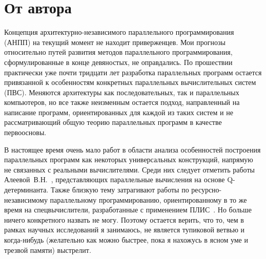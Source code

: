\section*{От автора}
\label{intro:author}

Концепция архитектурно-независимого параллельного программирования (АНПП) на текущий момент не находит приверженцев. Мои прогнозы относительно путей развития методов параллельного программирования, сформулированные в конце девяностых, не оправдались. По прошествии практически уже почти тридцати лет разработка параллельных программ остается привязанной к особенностям конкретных параллельных вычислительных систем (ПВС). Меняются архитектуры как последовательных, так и параллельных компьютеров, но все также неизменным остается подход, направленный на написание программ, ориентированных для каждой из таких систем и не рассматривающий общую теорию параллельных программ в качестве первоосновы.

В настоящее время очень мало работ в области анализа особенностей построения параллельных программ как некоторых универсальных конструкций, напрямую не связанных с реальными вычислителями. Среди них следует отметить работы Алеевой~В.Н.~\cite{aleeva-pct-2019}, представляющих параллельные вычисления на основе Q-детерминанта. Также близкую тему затрагивают работы по ресурсно-независимому параллельному программированию, ориентированному в то же время на спецвычислители, разработанные с применением ПЛИС~\cite{levin-pct-2018}. Но больше ничего конкретного назвать не могу. Поэтому остается верить, что то, чем в рамках научных исследований я занимаюсь, не является тупиковой ветвью и когда-нибудь (желательно как можно быстрее, пока я нахожусь в ясном уме и трезвой памяти) выстрелит.


